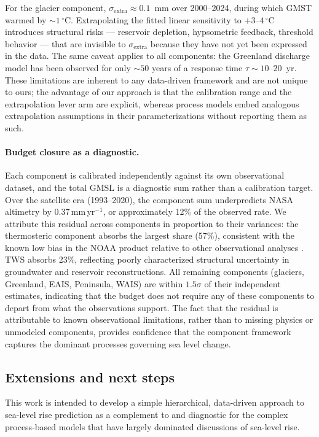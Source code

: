 \documentclass[11pt]{article}
\begin{document}
For the glacier component, $\sigma_{\mathrm{extra}} \approx 0.1$~mm over 2000--2024, during which GMST warmed by $\sim\!1\,^\circ$C. Extrapolating the fitted linear sensitivity to $+3$--$4\,^\circ$C introduces structural risks --- reservoir depletion, hypsometric feedback, threshold behavior --- that are invisible to $\sigma_{\mathrm{extra}}$ because they have not yet been expressed in the data. The same caveat applies to all components: the Greenland discharge model has been observed for only $\sim\!50$ years of a response time $\tau \sim 10$--$20$~yr. These limitations are inherent to any data-driven framework and are not unique to ours; the advantage of our approach is that the calibration range and the extrapolation lever arm are explicit, whereas process models embed analogous extrapolation assumptions in their parameterizations without reporting them as such.

\paragraph{Budget closure as a diagnostic.}
Each component is calibrated independently against its own observational dataset, and the total GMSL is a diagnostic sum rather than a calibration target. Over the satellite era (1993--2020), the component sum underpredicts NASA altimetry by 0.37\,mm\,yr$^{-1}$, or approximately 12\% of the observed rate. We attribute this residual across components in proportion to their variances: the thermosteric component absorbs the largest share (57\%), consistent with the known low bias in the NOAA product relative to other observational analyses \citep{Li2022, Cheng2017}. TWS absorbs 23\%, reflecting poorly characterized structural uncertainty in groundwater and reservoir reconstructions. All remaining components (glaciers, Greenland, EAIS, Peninsula, WAIS) are within $1.5\sigma$ of their independent estimates, indicating that the budget does not require any of these components to depart from what the observations support. The fact that the residual is attributable to known observational limitations, rather than to missing physics or unmodeled components, provides confidence that the component framework captures the dominant processes governing sea level change.

\subsection{Extensions and next steps}

This work is intended to develop a simple hierarchical, data-driven approach to sea-level rise prediction as a complement to and diagnostic for the complex process-based models that have largely dominated discussions of sea-level rise. 




\end{document}
